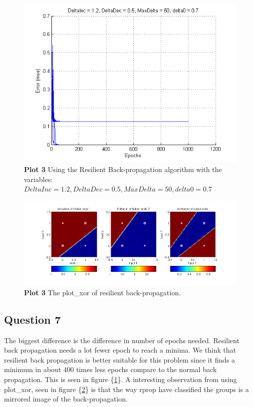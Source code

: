 \documentclass[a4paper]{article}
\begin{document}
\begin{figure}[h!] %
	\includegraphics[]{plot3_rprop.png}
	\caption{\label{fig:plot3_rprop}\textbf{Plot 3} Using the Resilient Back-propagation algorithm with the variables: $DeltaInc = 1.2, DeltaDec = 0.5, MaxDelta = 50, delta0 = 0.7$}
\end{figure}
\begin{figure}[h!] %
	\includegraphics[scale=0.55]{good_rprop_xor_plot.png}
	\caption{\label{fig:good_rprop_xor_plot}\textbf{Plot 3} The plot\_xor of resilient back-propagation.}
\end{figure}
\subsection*{Question 7}
The biggest difference is the difference in number of epochs needed. 
Resilient back propagation needs a lot fewer epoch to reach a minima.
We think that resilient back propagation is better suitable for this problem 
since it finds a minimum in about 400 times less epochs compare to the normal 
back propagation. This is seen in figure \{\ref{fig:plot3_rprop}\}.
A interesting observation from using plot\_xor, seen in figure \{\ref{fig:good_rprop_xor_plot}\} is that the way rprop have classified the groups is a mirrored image of the back-propagation. 
\end{document}
